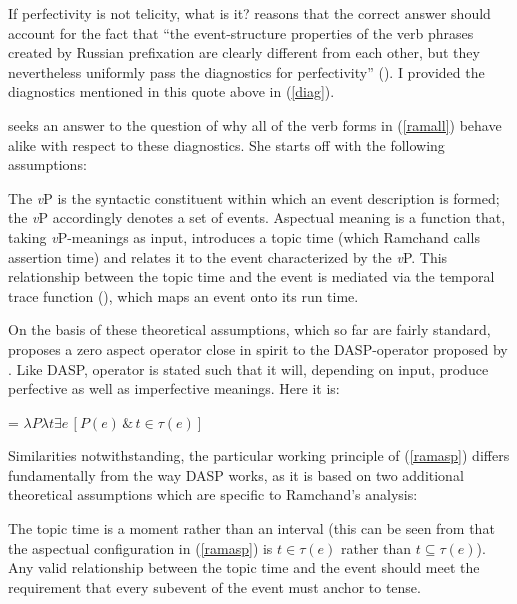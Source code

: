 \documentclass[output=paper,colorlinks,citecolor=brown]{langscibook}
\begin{document}
If perfectivity is not telicity, what is it? 
\citet{Ramchand08} reasons that the correct answer should account for the fact that ``the event-structure properties of the verb phrases created by Russian prefixation are clearly different from each other, but they nevertheless uniformly pass the diagnostics for perfectivity'' (\citealt[1698]{Ramchand08}).
I provided the diagnostics mentioned in this quote above in (\ref{diag}). 

\citet{Ramchand08} seeks an answer to the question of
why all of the verb forms in (\ref{ramall}) behave alike with respect to these diagnostics.  
She starts off with the following assumptions: 

\eanoraggedright\label{ramback} 
\eanoraggedright The \textit{v}P is the syntactic constituent within which an event description is formed; the \textit{v}P accordingly denotes a set of events. 
\ex Aspectual meaning is a function that, taking \textit{v}P-meanings as input, introduces a topic time (which Ramchand calls assertion time) and relates it to the event characterized by the \textit{v}P.
\ex This relationship between the topic time and the event is mediated via the temporal trace function (\citealt{Krifka1992,Krifka1998}), which maps an event onto its run time. 
\z\z

\noindent On the basis of these theoretical assumptions, which so far are fairly standard, \citet{Ramchand08} proposes a zero aspect operator close in spirit to the DASP-operator proposed by \citet{Bohne2004}. 
Like DASP,  operator is stated such that it will, depending on input, produce perfective as well as imperfective meanings. Here it is:

\ea
\label{ramasp} 
 = $\lambda P \lambda t \exists e \,[ P(e) \,\&\, t \in \tau(e)]$
\z

\noindent Similarities notwithstanding, the particular working principle of (\ref{ramasp}) differs fundamentally from the way DASP works, as it is based on two additional theoretical assumptions which are specific to Ramchand's analysis: 

\eanoraggedright\label{ramass} 
\eanoraggedright The topic time is a moment rather than an interval (this can be seen from that the aspectual configuration in (\ref{ramasp}) is $t \in \tau(e)$ rather than $t \subseteq \tau(e)$). 
\ex \label{ramassb} Any valid relationship between the topic time and the event should meet the requirement that every subevent of the event must anchor to tense.
\z\z
\end{document}
